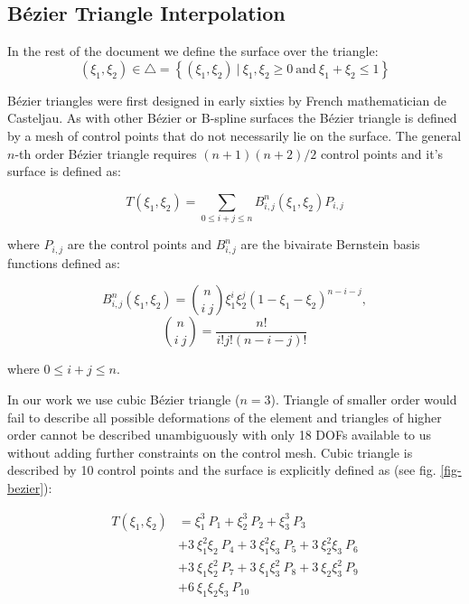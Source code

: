 \documentclass{egpubl}
\begin{document}
\subsection{B\'ezier Triangle Interpolation} %

In the rest of the document we define the surface over the triangle:
\begin{equation}
    (\xi_1,\xi_2) \in \bigtriangleup = \left\{ (\xi_1,\xi_2)~|~\xi_1, \xi_2 \ge 0
        \mathrm{~and~} \xi_1+\xi_2 \le 1 \right\}
\end{equation}

B\'ezier triangles were first designed in early sixties by French mathematician de Casteljau.
As with other B\'ezier or B-spline surfaces the B\'ezier triangle is
defined by a mesh of control points that do not necessarily lie on the
surface. The general $n$-th order B\'ezier triangle requires $(n + 1)(n +
2)/2$ control points and it's surface is defined as:

\begin{equation}
    T(\xi_1, \xi_2) = \sum_{0 \le i + j \le n} B^n_{i,j}(\xi_1,\xi_2) P_{i,j}
\end{equation}

\noindent
where $P_{i,j}$ are the control points and $B^n_{i,j}$ are the bivairate
Bernstein basis functions defined as:

\begin{equation}
  B^n_{i,j} (\xi_1,\xi_2) =
    \binom{n}{i~j} \xi_1^i \xi_2^j (1-\xi_1-\xi_2)^{n-i-j},
\end{equation}
\begin{equation}
  \binom{n}{i~j} = \frac{n!}{i!j!(n-i-j)!}
\end{equation}

\noindent
where $ 0 \le i+j \le n $.

In our work we use cubic B\'ezier triangle ($n=3$). Triangle of smaller order
would fail to describe all possible deformations of the element and
triangles of higher order cannot be described unambiguously with only 18
DOFs available to us without adding further constraints on the control
mesh. Cubic triangle is described by 10 control points and the surface is
explicitly defined as (see fig. \ref{fig-bezier}):

\begin{equation}\label{eq-cubicbez}
  \begin{split}
  T(\xi_1,\xi_2) & =
             \xi_1^3\ P_1
           + \xi_2^3\ P_2
           + \xi_3^3\ P_3 \\
         & + 3\ \xi_1^2 \xi_2\ P_4
           + 3\ \xi_1^2 \xi_3\ P_5
           + 3\ \xi_2^2 \xi_3\ P_6 \\
         & + 3\ \xi_1 \xi_2^2\ P_7
           + 3\ \xi_1 \xi_3^2\ P_8
           + 3\ \xi_2 \xi_3^2\ P_9 \\
         & + 6\ \xi_1 \xi_2 \xi_3\ P_{10} \\
  \end{split}
\end{equation}
\end{document}
